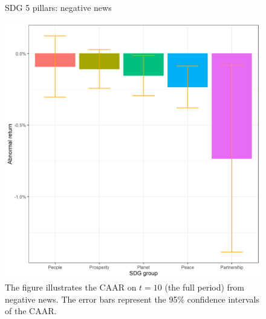 \begin{figure} [H]
    \centering
    \caption{SDG 5 pillars: negative news}
    \includegraphics[scale=0.6]{Projekt/1.Figures analysis/ST_negative_sdg_bar_groups_0.png}
    \caption*{\footnotesize The figure illustrates the CAAR on $t = 10$ (the full period) from negative news. The error bars represent the 95\% confidence intervals of the CAAR.}
    \label{fig:ST_neg_bar}
\end{figure}




